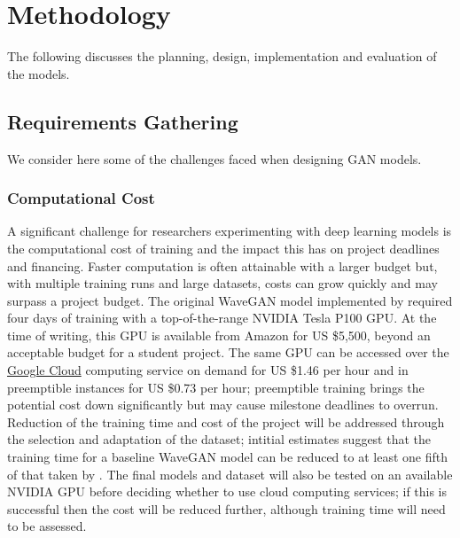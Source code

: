 \documentclass[a4paper, dvipsnames, titlepage]{article}
\begin{document}
\newpage

\section{Methodology}

The following discusses the planning, design, implementation and evaluation of the models.

\subsection{Requirements Gathering}

We consider here some of the challenges faced when designing GAN models.

\subsubsection{Computational Cost}

A significant challenge for researchers experimenting with deep learning models is the computational cost of training and the impact this has on project deadlines and financing.
Faster computation is often attainable with a larger budget but, with multiple training runs and large datasets, costs can grow quickly and may surpass a project budget.
\newline
\newline
The original WaveGAN model implemented by \citeauthor{2018arXiv180204208D} required four days of training with a top-of-the-range NVIDIA Tesla P100 GPU.
At the time of writing, this GPU is available from Amazon for US \$5,500, beyond an acceptable budget for a student project.
The same GPU can be accessed over the \href{https://cloud.google.com/gpu/}{Google Cloud} computing service on demand for US \$1.46 per hour and in preemptible instances for US \$0.73 per hour; preemptible training brings the potential cost down significantly but may cause milestone deadlines to overrun.
\newline
\newline
Reduction of the training time and cost of the project will be addressed through the selection and adaptation of the dataset; intitial estimates suggest that the training time for a baseline WaveGAN model can be reduced to at least one fifth of that taken by \citeauthor{2018arXiv180204208D}.
The final models and dataset will also be tested on an available NVIDIA GPU before deciding whether to use cloud computing services; if this is successful then the cost will be reduced further, although training time will need to be assessed.
\end{document}
